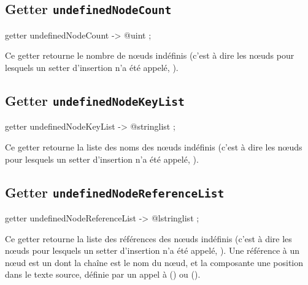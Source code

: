 \subsection{Getter \texttt{undefinedNodeCount}}

\begin{galgascode}
getter undefinedNodeCount -> @uint ;
\end{galgascode}

Ce getter retourne le nombre de nœuds indéfinis (c'est à dire les nœuds pour lesquels un setter d'insertion n'a été appelé, ).







\subsection{Getter \texttt{undefinedNodeKeyList}}

\begin{galgascode}
getter undefinedNodeKeyList -> @stringlist ;
\end{galgascode}

Ce getter retourne la liste des noms des nœuds indéfinis (c'est à dire les nœuds pour lesquels un setter d'insertion n'a été appelé, ).








\subsection{Getter \texttt{undefinedNodeReferenceList}}

\begin{galgascode}
getter undefinedNodeReferenceList -> @lstringlist ;
\end{galgascode}

Ce getter retourne la liste des références des nœuds indéfinis (c'est à dire les nœuds pour lesquels un setter d'insertion n'a été appelé, ). Une référence à un nœud est un  dont la chaîne est le nom du nœud, et la composante  une position dans le texte source, définie par un appel à  () ou  ().




